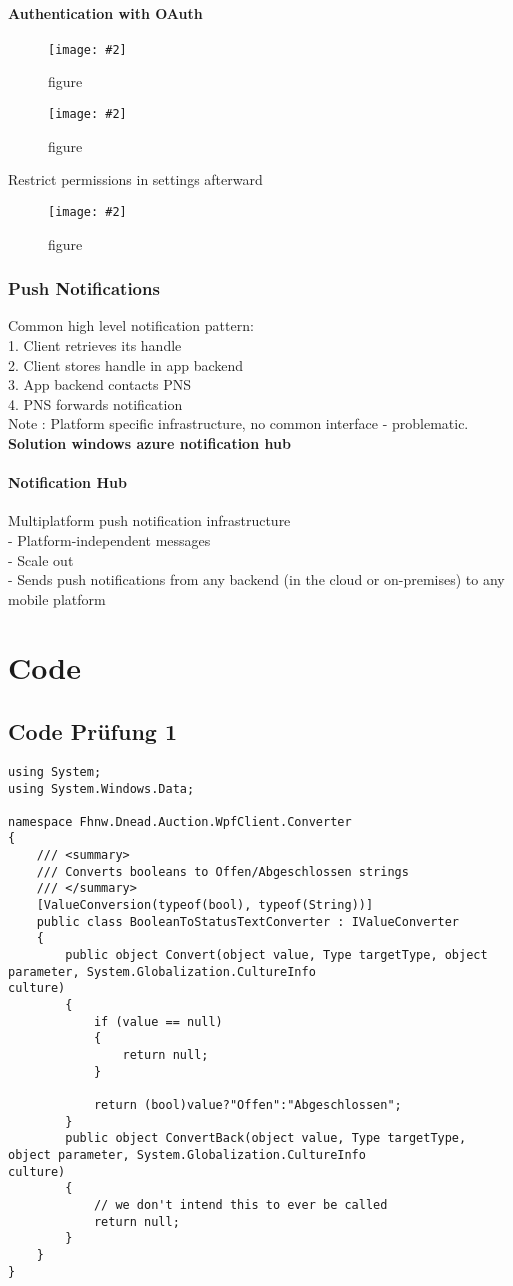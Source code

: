 \documentclass[a4paper,10pt]{scrreprt}
\newcommand{\pic}[2][figure]{\begin{figure}[h]
 \centering
 \texttt{[image: \#2]}
 \caption{#1}
\end{figure}
}
\begin{document}
\subsection{Authentication with OAuth}
\pic{oa1.png}
\pic{oa2.png}

\begin{framed}
 Restrict permissions in settings afterward
\end{framed}
\pic{oalog.png}

\section{Push Notifications}
Common high level notification pattern:\\
1. Client retrieves its handle\\
2. Client stores handle in app backend\\
3. App backend contacts PNS\\
4. PNS forwards notification\\
Note : Platform specific infrastructure, no common interface - problematic.\\
\textbf{Solution windows azure notification hub}\\

\subsection{Notification Hub}
Multiplatform push notification infrastructure\\
- Platform-independent messages\\
- Scale out\\
- Sends push notifications from any backend
(in the cloud or on-premises) to any mobile
platform


\part{Code}
\chapter{Code Prüfung 1}

\begin{lstlisting}[caption=Converter WPF]
using System;
using System.Windows.Data;

namespace Fhnw.Dnead.Auction.WpfClient.Converter
{
    /// <summary>
    /// Converts booleans to Offen/Abgeschlossen strings
    /// </summary>
    [ValueConversion(typeof(bool), typeof(String))]
    public class BooleanToStatusTextConverter : IValueConverter
    {
        public object Convert(object value, Type targetType, object parameter, System.Globalization.CultureInfo 
culture)
        {
            if (value == null)
            {
                return null;
            }

            return (bool)value?"Offen":"Abgeschlossen";
        }
        public object ConvertBack(object value, Type targetType, object parameter, System.Globalization.CultureInfo 
culture)
        {
            // we don't intend this to ever be called
            return null;
        }
    }
}
\end{lstlisting}
\end{document}

